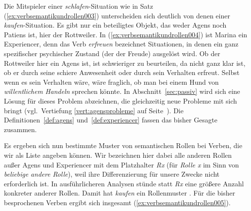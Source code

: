 Die Mitspieler einer \textit{schlafen}-Situation wie in Satz (\ref{ex:verbsemantikundrollen003}) unterscheiden sich deutlich von denen einer \textit{kaufen}-Situation.
Es gibt nur ein beteiligtes Objekt, das weder Agens noch Patiens ist, hier der Rottweiler.
In (\ref{ex:verbsemantikundrollen004}) ist Marina ein Experiencer, denn das Verb \textit{erfreuen} bezeichnet Situationen, in denen ein ganz spezifischer psychischer Zustand (der der Freude) ausgelöst wird.
Ob der Rottweiler hier ein Agens ist, ist schwieriger zu beurteilen, da nicht ganz klar ist, ob er durch seine schiere Anwesenheit oder durch sein Verhalten erfreut.
Selbst wenn es sein Verhalten wäre, wäre fraglich, ob man bei einem Hund von \textit{willentlichem Handeln} sprechen könnte.
In Abschnitt~\ref{sec:passiv} wird sich eine Lösung für dieses Problem abzeichnen, die gleichzeitig neue Probleme mit sich bringt (vgl.\ Vertiefung \ref{vert:agensprobleme} auf Seite~\pageref{vert:agensprobleme}).
Die Definitionen~\ref{def:agens} und~\ref{def:experiencer} fassen das bisher Gesagte zusammen.



Es ergeben sich nun bestimmte Muster von semantischen Rollen bei Verben, die wir als Liste angeben können.
Wir bezeichnen hier dabei alle anderen Rollen außer Agens und Experiencer mit dem Platzhalter \textit{Rx} (für \textit{Rolle x} im Sinn von \textit{beliebige andere Rolle}), weil ihre Differenzierung für unsere Zwecke nicht erforderlich ist.
In ausführlicheren Analysen stünde statt \textit{Rx} eine größere Anzahl konkreter anderer Rollen.
Damit hat \zB \textit{kaufen} ein Rollenmuster .
Für die bisher besprochenen Verben ergibt sich insgesamt (\ref{ex:verbsemantikundrollen005}).

\begin{exe}
  \ex\label{ex:verbsemantikundrollen005}
  \begin{xlist}
  \end{xlist}
\end{exe}

